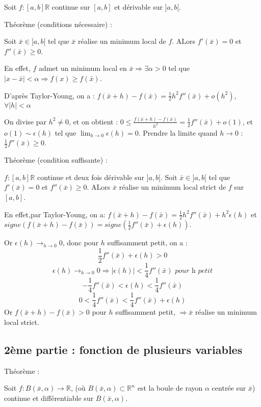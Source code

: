 		Soit $f : [a, b] \mathbb{R}$ continue sur $[a, b]$ et dérivable sur $]a, b[$.
		
		Théorème (conditions nécessaire) : 
		
		Soit $\bar{x} \in ]a, b[$ tel que $\bar{x}$ réalise un minimum local de $f$. ALors $f'(\bar{x}) = 0$ et $f''(\bar{x}) \geq 0$.
		
		En effet, $f$ admet un minimum local en $\bar{x} \Rightarrow \exists \alpha >0$ tel que $|x-\bar{x}|<\alpha \Rightarrow f(x) \geq f(\bar{x})$.
		
		D'après Taylor-Young, on a : $\displaystyle f(\bar{x}+h) -f(\bar{x}) = \frac{1}{2} h^2 f''(\bar{x}) + o(h^2)$, $\forall |h|<\alpha$
		
		On divise par $h^2 \ne 0$, et on obtient : $\displaystyle 0 \leq \frac{f(\bar{x}+h) - f(\bar{x}) }{ h^2 } = \frac{1}{2} f''(\bar{x}) + o(1) $, et $o(1) \sim \epsilon(h)$ tel que $\lim_{h \rightarrow 0} \epsilon(h) = 0$.
		Prendre la limite quand $h\rightarrow 0$ : $\frac{1}{2} f''(\bar{x}) \geq 0$.
		
		
		Théorème (condition suffisante) :
		
		$f : [a, b] \mathbb{R}$ continue et deux fois dérivable sur $]a, b[$. Soit $\bar{x} \in ]a, b[$ tel que $f'(\bar{x}) = 0$ et $f''(\bar{x}) \geq 0$. ALors $\bar{x}$ réalise un minimum local strict de $f$ sur $[a, b]$.
		
		En effet,par Taylor-Young, on a: $f(\bar{x}+h) -f(\bar{x}) = \frac{1}{2} h^2 f''(\bar{x}) + h^2 \epsilon(h)$ et $signe( f(\bar{x}+h) - f(\bar{x}) ) = signe( \frac{1}{2} f''(\bar{x}) + \epsilon(h))$.
		
		Or $\displaystyle \epsilon(h) \longrightarrow_{h\rightarrow 0} 0$, donc pour $h$ suffisamment petit, on a : 
		\[ \frac{1}{2} f''(\bar{x}) + \epsilon(h) >0\]
		\[ \epsilon(h) \longrightarrow_{h\rightarrow 0} 0 \Rightarrow |\epsilon(h)| < \frac{1}{4} f''(\bar{x}) \textit{ pour h petit}\]
		\[-\frac{1}{4} f''(\bar{x}) < \epsilon(h) < \frac{1}{4} f''(\bar{x})\]
		\[0< \frac{1}{4} f''(\bar{x}) < \frac{1}{4} f''(\bar{x}) + \epsilon(h) \]
		Or $f(\bar{x}+h) - f(\bar{x}) >0$ pour $h$ suffisamment petit, $ \Rightarrow \bar{x}$ réalise un minimum local strict.
		
		\subsection{2ème partie : fonction de plusieurs variables}
		
		Théorème :
		
		Soit $f : B(\bar{x}, \alpha) \rightarrow \mathbb{R}$,  (où $B(\bar{x}, \alpha) \subset \mathbb{R}^n$ est la boule de rayon $\alpha$ centrée sur $\bar{x}$) continue et différentiable sur $B(\bar{x}, \alpha)$.
		
